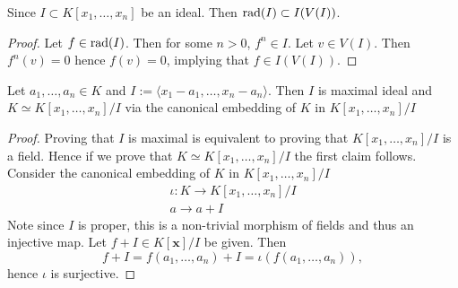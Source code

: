 \begin{lemma}\label{RadicalIsSubsetOfIdealOfVanishingSetOfIdeal}
    Since $I\subset K[x_1,\dots,x_n]$ be an ideal. Then $\mathrm{rad}(I) \subset I(V(I))$.
\end{lemma}
\begin{proof}
    Let $f \in \mathrm{rad}(I)$. Then for some $n>0$, $f^n\in I$. Let $v\in V(I)$. Then $f^n(v)=0$ hence $f(v)=0$, implying that $f\in I(V(I))$.
\end{proof}

\begin{lemma}
    Let $a_1,\dots,a_n\in K$ and $I :=\langle x_1-a_1,\dots,x_n-a_n\rangle$. Then $I$ is maximal ideal and $K \simeq K[x_1,\dots,x_n]/I$ via the canonical embedding of $K$ in $K[x_1,\dots,x_n]/I$
\end{lemma}
\begin{proof}
    Proving that $I$ is maximal is equivalent to proving that $K[x_1,\dots,x_n]/I$ is a field. Hence if we prove that $K\simeq K[x_1,\dots,x_n]/I$ the first claim follows. Consider the canonical embedding of $K$ in $K[x_1,\dots,x_n]/I$ 
    \begin{gather*}
        \iota : K \rightarrow K[x_1,\dots,x_n]/I\\
        a \rightarrow a + I
    \end{gather*}
   Note since $I$ is proper, this is a non-trivial morphism of fields and thus an injective map. Let $f+I\in K[\mathbf{x}]/I$ be given. Then  
   $$f+I=f(a_1,\dots,a_n)+I=\iota(f(a_1,\dots,a_n)),$$
   hence $\iota$ is surjective.
\end{proof}
